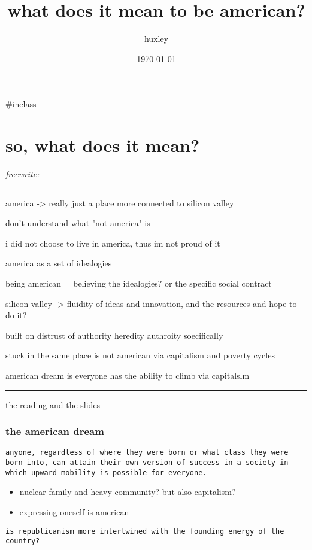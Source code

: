 \documentclass[letterpaper]{article}
\author{huxley}
\date{\today}
\title{what does it mean to be american?}
\renewcommand{\tableofcontents}{}
\begin{document}
\tableofcontents

\#inclass

\section{so, what does it mean?}
\label{sec:org12c4781}
\emph{freewrite:}

\noindent\rule{\textwidth}{0.5pt}

america -> really just a place more connected to silicon valley

don't understand what "not america" is

i did not choose to live in america, thus im not proud of it

america as a set of idealogies

being american = believing the idealogies? or the specific social
contract

silicon valley -> fluidity of ideas and innovation, and the resources
and hope to do it?

built on distrust of authority heredity authroity soecifically

stuck in the same place is not american via capitalism and poverty
cycles

american dream is everyone has the ability to climb via capitalslm

\noindent\rule{\textwidth}{0.5pt}

\href{https://docs.google.com/document/d/15X8knvkTgq1R4WklZ0GcP2RzaiYshO1L5mzkb1yhBQo/edit\#}{the
reading} and
\href{https://nuevaschool.instructure.com/courses/3776/modules/items/219697}{the
slides}

\subsubsection{the american dream}
\label{sec:org4bb2d81}
\begin{verbatim}
anyone, regardless of where they were born or what class they were born into, can attain their own version of success in a society in which upward mobility is possible for everyone.
\end{verbatim}

\begin{itemize}
\item nuclear family and heavy community? but also capitalism?
\item expressing oneself is american
\end{itemize}

\begin{verbatim}
is republicanism more intertwined with the founding energy of the country?
\end{verbatim}
\end{document}
